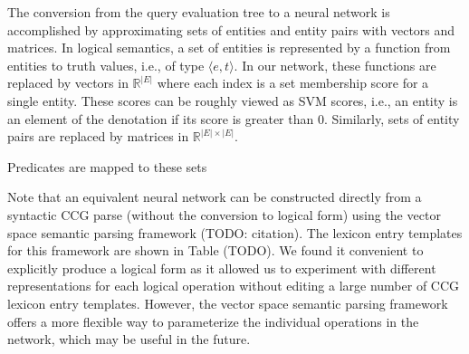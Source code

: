 \documentclass[11pt,letterpaper]{article}
\newcommand{\afunc}[2]{\ensuremath{ \langle #1 , #2 \rangle }}
\begin{document}
The conversion from the query evaluation tree to a neural network is
accomplished by approximating sets of entities and entity pairs with
vectors and matrices. In logical semantics, a set of entities is
represented by a function from entities to truth values, i.e., of type
$\afunc{e}{t}$. In our network, these functions are replaced by
vectors in $\mathbb{R}^{|E|}$ where each index is a set membership
score for a single entity. These scores can be roughly viewed as SVM
scores, i.e., an entity is an element of the denotation if its score
is greater than 0. Similarly, sets of entity pairs are replaced by
matrices in $\mathbb{R}^{|E| \times |E|}$.

Predicates are mapped to these sets

Note that an equivalent neural network can be constructed directly
from a syntactic CCG parse (without the conversion to logical form)
using the vector space semantic parsing framework (TODO:
citation). The lexicon entry templates for this framework are shown in
Table (TODO). We found it convenient to explicitly produce a logical
form as it allowed us to experiment with different representations for
each logical operation without editing a large number of CCG lexicon
entry templates. However, the vector space semantic parsing framework
offers a more flexible way to parameterize the individual operations
in the network, which may be useful in the future.

% 
% 
\end{document}
